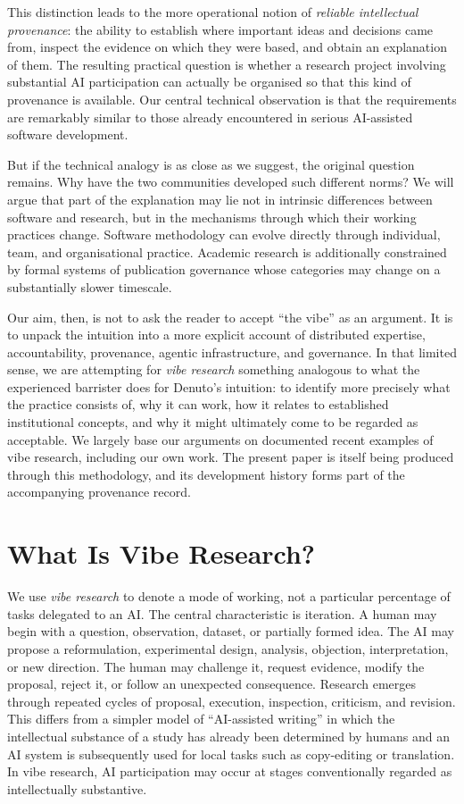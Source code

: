 \documentclass[12pt]{article}
\begin{document}
This distinction leads to the more operational notion of \emph{reliable intellectual provenance}: the ability to establish where important ideas and decisions came from, inspect the evidence on which they were based, and obtain an explanation of them. The resulting practical question is whether a research project involving substantial AI participation can actually be organised so that this kind of provenance is available. Our central technical observation is that the requirements are remarkably similar to those already encountered in serious AI-assisted software development.

But if the technical analogy is as close as we suggest, the original question remains. Why have the two communities developed such different norms? We will argue that part of the explanation may lie not in intrinsic differences between software and research, but in the mechanisms through which their working practices change. Software methodology can evolve directly through individual, team, and organisational practice. Academic research is additionally constrained by formal systems of publication governance whose categories may change on a substantially slower timescale.

Our aim, then, is not to ask the reader to accept ``the vibe'' as an argument. It is to unpack the intuition into a more explicit account of distributed expertise, accountability, provenance, agentic infrastructure, and governance. In that limited sense, we are attempting for \emph{vibe research} something analogous to what the experienced barrister does for Denuto's intuition: to identify more precisely what the practice consists of, why it can work, how it relates to established institutional concepts, and why it might ultimately come to be regarded as acceptable.
We largely base our arguments on documented recent examples of vibe research, including our own work. The present paper is itself being produced through this methodology, and its development history forms part of the accompanying provenance record.


\section{What Is Vibe Research?}

We use \emph{vibe research} to denote a mode of working, not a particular percentage of tasks delegated to an AI.
The central characteristic is iteration. A human may begin with a question, observation, dataset, or partially formed idea. The AI may propose a reformulation, experimental design, analysis, objection, interpretation, or new direction. The human may challenge it, request evidence, modify the proposal, reject it, or follow an unexpected consequence. Research emerges through repeated cycles of proposal, execution, inspection, criticism, and revision.
This differs from a simpler model of ``AI-assisted writing'' in which the intellectual substance of a study has already been determined by humans and an AI system is subsequently used for local tasks such as copy-editing or translation. In vibe research, AI participation may occur at stages conventionally regarded as intellectually substantive.
\end{document}
